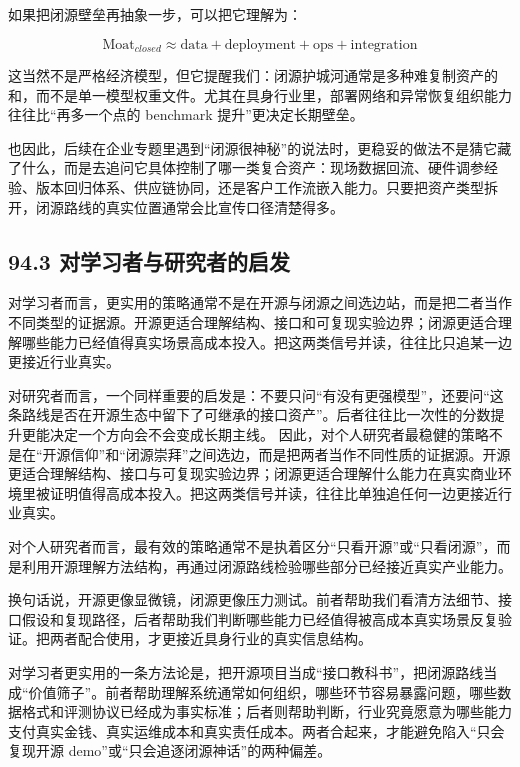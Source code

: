 如果把闭源壁垒再抽象一步，可以把它理解为：

\begingroup
\scriptsize
\begin{equation*}
\text{Moat}_{closed} \approx \text{data} + \text{deployment} + \text{ops} + \text{integration}
\end{equation*}
\endgroup

这当然不是严格经济模型，但它提醒我们：闭源护城河通常是多种难复制资产的和，而不是单一模型权重文件。尤其在具身行业里，部署网络和异常恢复组织能力往往比“再多一个点的 benchmark 提升”更决定长期壁垒。

也因此，后续在企业专题里遇到“闭源很神秘”的说法时，更稳妥的做法不是猜它藏了什么，而是去追问它具体控制了哪一类复合资产：现场数据回流、硬件调参经验、版本回归体系、供应链协同，还是客户工作流嵌入能力。只要把资产类型拆开，闭源路线的真实位置通常会比宣传口径清楚得多。

\subsection*{94.3 对学习者与研究者的启发}


对学习者而言，更实用的策略通常不是在开源与闭源之间选边站，而是把二者当作不同类型的证据源。开源更适合理解结构、接口和可复现实验边界；闭源更适合理解哪些能力已经值得真实场景高成本投入。把这两类信号并读，往往比只追某一边更接近行业真实。

对研究者而言，一个同样重要的启发是：不要只问“有没有更强模型”，还要问“这条路线是否在开源生态中留下了可继承的接口资产”。后者往往比一次性的分数提升更能决定一个方向会不会变成长期主线。 因此，对个人研究者最稳健的策略不是在“开源信仰”和“闭源崇拜”之间选边，而是把两者当作不同性质的证据源。开源更适合理解结构、接口与可复现实验边界；闭源更适合理解什么能力在真实商业环境里被证明值得高成本投入。把这两类信号并读，往往比单独追任何一边更接近行业真实。

对个人研究者而言，最有效的策略通常不是执着区分“只看开源”或“只看闭源”，而是利用开源理解方法结构，再通过闭源路线检验哪些部分已经接近真实产业能力。

换句话说，开源更像显微镜，闭源更像压力测试。前者帮助我们看清方法细节、接口假设和复现路径，后者帮助我们判断哪些能力已经值得被高成本真实场景反复验证。把两者配合使用，才更接近具身行业的真实信息结构。

对学习者更实用的一条方法论是，把开源项目当成“接口教科书”，把闭源路线当成“价值筛子”。前者帮助理解系统通常如何组织，哪些环节容易暴露问题，哪些数据格式和评测协议已经成为事实标准；后者则帮助判断，行业究竟愿意为哪些能力支付真实金钱、真实运维成本和真实责任成本。两者合起来，才能避免陷入“只会复现开源 demo”或“只会追逐闭源神话”的两种偏差。

